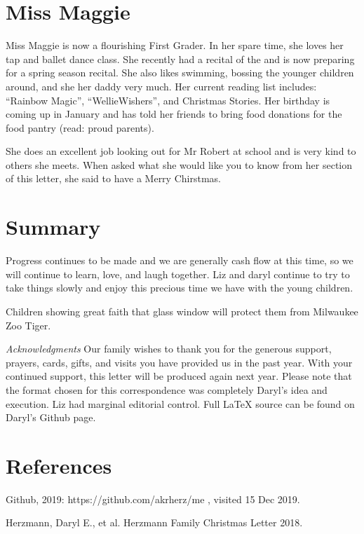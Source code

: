 \documentclass[letterpaper,11pt]{article}
\makeatletter
\def\refer{\par\noindent\hangindent\parindent\hangafter1}
\newenvironment{figurehere}
  {\def\@captype{figure}}
  {}
\makeatother
\begin{document}
\begin{multicols}{2}
\bigskip

\section{Miss Maggie}

Miss Maggie is now a flourishing First Grader. In her spare time, she loves her
tap and ballet dance class.  She recently had a recital of the 
and is now preparing for a spring season recital.  She also likes swimming,
bossing the younger children around, and she  her daddy very
much.  Her current reading list includes:
\enquote{Rainbow Magic}, \enquote{WellieWishers\texttrademark}, and
Christmas Stories.  Her birthday is coming up in January and has told her
friends to bring food donations for the food pantry (read: proud parents).

She does an excellent job looking out for Mr Robert at school and is very kind
to others she meets.  When asked what she would like you to know from her
section of this letter, she said to have a Merry Chirstmas.

\section{Summary}

Progress continues to be made and we are generally cash flow  at this
time, so we will continue to learn, love, and laugh together.  Liz and daryl continue
to try to take things slowly and enjoy this precious time we have with the young
children.

\bigskip

\begin{figurehere}
 \centering   
 \caption{Children showing great faith that glass window will protect them from Milwaukee Zoo Tiger.}
\end{figurehere}

\bigskip

\emph{Acknowledgments} Our family wishes to thank you for the generous 
support, prayers, cards, gifts, and visits you have provided us in the past
year. With your continued support, this letter will be produced again
next year. Please note that the format chosen for this
correspondence was completely Daryl's idea and execution. Liz had marginal
editorial control. Full \LaTeX\xspace source can be found on Daryl's Github
page.

\section{References}

\refer Github, 2019: https://github.com/akrherz/me , visited 15 Dec 2019.
\refer Herzmann, Daryl E., et al. Herzmann Family Christmas Letter 2018.

\end{multicols}
\end{document}
